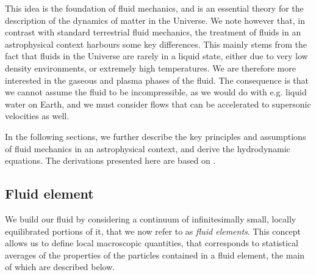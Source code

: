This idea is the foundation of fluid mechanics, and is an essential theory for the description of the dynamics of matter in the Universe. We note however that, in contrast with standard terrestrial fluid mechanics, the treatment of fluids in an astrophysical context harbours some key differences. This mainly stems from the fact that fluids in the Universe are rarely in a liquid state, either due to very low density environments, or extremely high temperatures. We are therefore more interested in the gaseous and plasma phases of the fluid. The consequence is that we cannot assume the fluid to be incompressible, as we would do with e.g. liquid water on Earth, and we must consider flows that can be accelerated to supersonic velocities as well.

In the following sections, we further describe the key principles and assumptions of fluid mechanics in an astrophysical context, and derive the hydrodynamic equations. %
The derivations presented here are based on \cite{Clarke2007}. 

\subsection{Fluid element} \label{sec:fluid_elem}

We build our fluid by considering a continuum of infinitesimally small, locally equilibrated portions of it, that we now refer to as \emph{fluid elements}. This concept allows us to define local macroscopic quantities, that corresponds to statistical averages of the properties of the particles contained in a fluid element, the main of which are described below.

